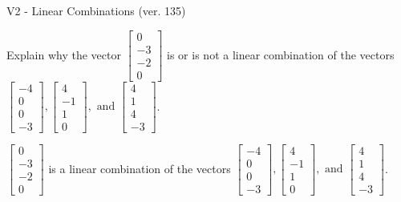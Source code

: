 \begin{exercise}
  \begin{exerciseTitle}V2 - Linear Combinations (ver. 135)\end{exerciseTitle}
  \begin{exerciseStatement}
    Explain why the vector \(\left[\begin{array}{c}
0 \\
-3 \\
-2 \\
0
\end{array}\right]\)  is or is not a linear 
	combination of the vectors \(\left[\begin{array}{c}
-4 \\
0 \\
0 \\
-3
\end{array}\right] , \left[\begin{array}{c}
4 \\
-1 \\
1 \\
0
\end{array}\right] , \text{ and } \left[\begin{array}{c}
4 \\
1 \\
4 \\
-3
\end{array}\right]\).
	


  \end{exerciseStatement}
  \begin{exerciseAnswer}
   \(\left[\begin{array}{c}
0 \\
-3 \\
-2 \\
0
\end{array}\right]\) 
  	 is  
	a linear combination of the vectors \(\left[\begin{array}{c}
-4 \\
0 \\
0 \\
-3
\end{array}\right] , \left[\begin{array}{c}
4 \\
-1 \\
1 \\
0
\end{array}\right] , \text{ and } \left[\begin{array}{c}
4 \\
1 \\
4 \\
-3
\end{array}\right]\).

	
  


  \end{exerciseAnswer}
\end{exercise}